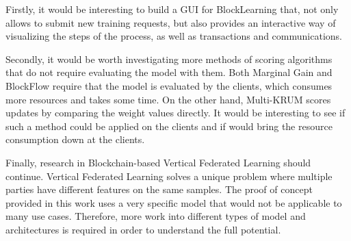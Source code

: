Firstly, it would be interesting to build a GUI for BlockLearning that, not only allows to submit new training requests, but also provides an interactive way of visualizing the steps of the process, as well as transactions and communications.

Secondly, it would be worth investigating more methods of scoring algorithms that do not require evaluating the model with them. Both Marginal Gain and BlockFlow require that the model is evaluated by the clients, which consumes more resources and takes some time. On the other hand, Multi-KRUM scores updates by comparing the weight values directly. It would be interesting to see if such a method could be applied on the clients and if would bring the resource consumption down at the clients.

Finally, research in Blockchain-based Vertical Federated Learning should continue. Vertical Federated Learning solves a unique problem where multiple parties have different features on the same samples. The proof of concept provided in this work uses a very specific model that would not be applicable to many use cases. Therefore, more work into different types of model and architectures is required in order to understand the full potential.
